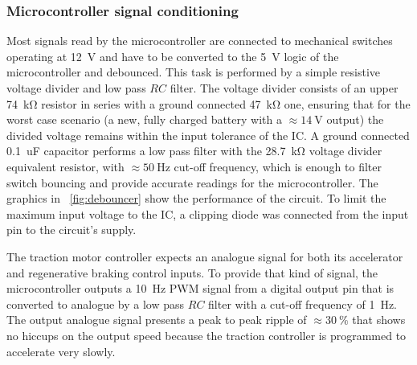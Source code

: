 \documentclass[journal]{IEEEtran}
\begin{document}
\subsubsection{Microcontroller signal conditioning}

Most signals read by the microcontroller are connected to mechanical switches operating at \SI{12}{\volt} and have to be converted to the \SI{5}{\volt} logic of the microcontroller and debounced. This task is performed by a simple resistive voltage divider and low pass $RC$ filter. The voltage divider consists of an upper \SI{74}{\kilo\ohm} resistor in series with a ground connected \SI{47}{\kilo\ohm} one, ensuring that for the worst case scenario (a new, fully charged battery with a $\approx\SI{14}{\volt}$ output) the divided voltage remains within the input tolerance of the \ac{IC}. A ground connected \SI{0.1}{uF} capacitor performs a low pass filter with the \SI{28.7}{\kilo\ohm} voltage divider equivalent resistor, with $\approx\SI{50}{\hertz}$ cut-off frequency, which is enough to filter switch bouncing and provide accurate readings for the microcontroller. The graphics in \figurename~\ref{fig:debouncer} show the performance of the circuit. To limit the maximum input voltage to the \ac{IC}, a clipping diode was connected from the input pin to the circuit's supply.%

The traction motor controller expects an analogue signal for both its accelerator and regenerative braking control inputs. To provide that kind of signal, the microcontroller outputs a \SI{10}{\hertz} \ac{PWM} signal from a digital output pin that is converted to analogue by a low pass $RC$ filter with a cut-off frequency of \SI{1}{\hertz}. The output analogue signal presents a peak to peak ripple of $\approx\SI{30}{\%}$ that shows no hiccups on the output speed because the traction controller is programmed to accelerate very slowly.
\end{document}
